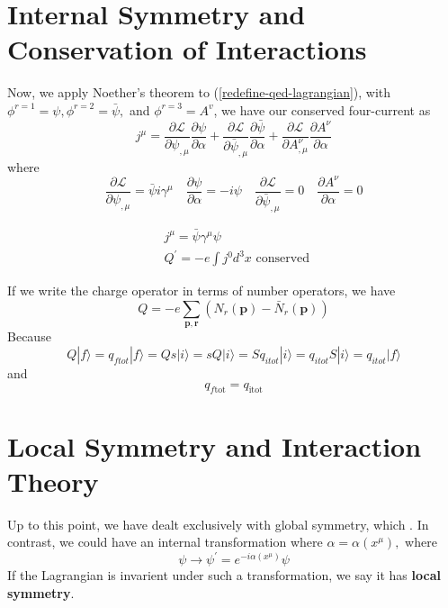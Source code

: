 \section{Internal Symmetry and Conservation of Interactions}
Now, we apply Noether's theorem to (\ref{redefine-qed-lagrangian}), with $\phi^{r=1}=\psi, \phi^{r=2}=\bar{\psi},$ and $\phi^{r=3}=A^{v}$, we have our conserved four-current as
\begin{equation}
j^{\mu}=\frac{\partial \mathcal{L}}{\partial \psi_{, \mu}} \frac{\partial \psi}{\partial \alpha}+\frac{\partial \mathcal{L}}{\partial \bar{\psi}_{,\mu}} \frac{\partial \bar{\psi}}{\partial \alpha}+\frac{\partial \mathcal{L}}{\partial A_{,\mu}^{\nu}} \frac{\partial A^{\nu}}{\partial \alpha}
\end{equation}
where
\begin{equation}
\frac{\partial \mathcal{L}}{\partial \psi_{,\mu}}=\bar{\psi} i \gamma^{\mu} \quad \frac{\partial \psi}{\partial \alpha}=-i \psi \quad \frac{\partial \mathcal{L}}{\partial \bar{\psi}_{,\mu}}=0 \quad \frac{\partial A^{\nu}}{\partial \alpha}=0
\end{equation}
\begin{qt}
    $$
\begin{aligned}
&j^{\mu}=\bar{\psi} \gamma^{\mu} \psi\\
&Q^{\prime}=-e \int j^{0} d^{3} x \text { conserved }
\end{aligned}
$$
\end{qt}
If we write the charge operator in terms of number operators, we have
$$
Q=-e \sum_{\mathbf{p}, \mathbf{r}}\left(N_{r}(\mathbf{p})-\bar{N}_{r}(\mathbf{p})\right)
$$
Because 
$$
Q|f\rangle= q_{f to t}|f\rangle= Q s|i\rangle= s Q|i\rangle= S q_{i t o t}|i\rangle= q_{i t o t} S|i\rangle= q_{i t o t}|f\rangle
$$
and
$$
q_{f \text {tot}}=q_{\text {itot}}
$$

\section{Local Symmetry and Interaction Theory}
Up to this point, we have dealt exclusively with global symmetry, which \textbf{}. In contrast, we could have an internal transformation where $\alpha=\alpha\left(x^{\mu}\right),$ where \textbf{}
\begin{equation}
\psi \rightarrow \psi^{\prime}=e^{-i \alpha\left(x^{\mu}\right)} \psi
\end{equation}
If the Lagrangian is invarient under such a transformation, we say it has \textbf{local symmetry}.

